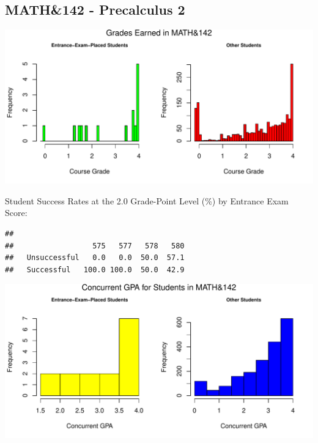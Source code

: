 \documentclass[twoside]{article}\usepackage[]{graphicx}\usepackage[]{color}
\makeatletter
\def\maxwidth{ %
  \ifdim\Gin@nat@width>\linewidth
    \linewidth
  \else
    \Gin@nat@width
  \fi
}
\newenvironment{kframe}{%
 \def\at@end@of@kframe{}%
 \ifinner\ifhmode%
  \def\at@end@of@kframe{\end{minipage}}%
  \begin{minipage}{\columnwidth}%
 \fi\fi%
 \def\FrameCommand##1{\hskip\@totalleftmargin \hskip-\fboxsep
 \colorbox{shadecolor}{##1}\hskip-\fboxsep
     \hskip-\linewidth \hskip-\@totalleftmargin \hskip\columnwidth}%
 \MakeFramed {\advance\hsize-\width
   \@totalleftmargin\z@ \linewidth\hsize
   \@setminipage}}%
 {\par\unskip\endMakeFramed%
 \at@end@of@kframe}
\newenvironment{knitrout}{}{} %
\makeatother
\begin{document}
\newpage
\subsection{MATH\&142 - Precalculus 2}


\begin{knitrout}
\color{fgcolor}
\includegraphics[width=\maxwidth]{figure/graphs142-1} 

\end{knitrout}



Student Success Rates  at the 2.0 Grade-Point Level (\%) by Entrance Exam Score:

\begin{knitrout}
\color{fgcolor}\begin{kframe}
\begin{verbatim}
##               
##                  575   577   578   580
##   Unsuccessful   0.0   0.0  50.0  57.1
##   Successful   100.0 100.0  50.0  42.9
\end{verbatim}
\end{kframe}
\end{knitrout}


\begin{knitrout}
\color{fgcolor}
\includegraphics[width=\maxwidth]{figure/GPAgraphs142-1} 

\end{knitrout}
\end{document}
